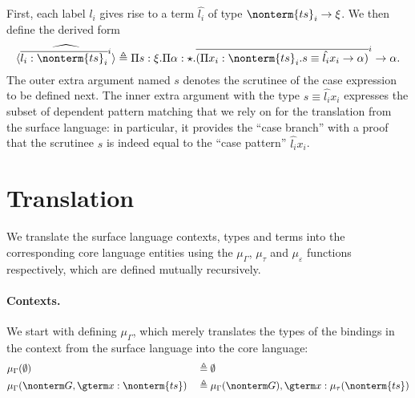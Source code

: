 \documentclass[a4paper]{article}
\begin{document}
\begin{itemize}
    First, each label $l_i$ gives rise to a term $\hat{l_i}$ of type $\nonterm{ts}_i \rightarrow \xi$.
    We then define the derived form
    \[
      \widehat{\langle \overline{l_i : \nonterm{ts}_i}^i \rangle}
        \triangleq
          \Pi s : \xi.
          \Pi \alpha : \star.
          \overline{(\Pi x_i : \nonterm{ts}_i. s \equiv \hat{l_i} x_i \rightarrow \alpha)}^i \rightarrow \alpha.
    \]
    The outer extra argument named $s$ denotes the scrutinee of the case expression to be defined next.
    The inner extra argument with the type $s \equiv \hat{l_i} x_i$
    expresses the subset of dependent pattern matching
    that we rely on for the translation from the surface language:
    in particular, it provides the ``case branch'' with a proof
    that the scrutinee $s$ is indeed equal to the ``case pattern'' $\hat{l_i} x_i$.
\end{itemize}

\section{Translation}

\newcommand{\tranctx}{\mu_\Gamma}
\newcommand{\tranty}{\mu_\tau}
\newcommand{\tranterm}{\mu_\varepsilon}

We translate the surface language contexts, types and terms into the corresponding core language entities
using the $\tranctx$, $\tranty$ and $\tranterm$ functions respectively,
which are defined mutually recursively.

\paragraph{Contexts.}
We start with defining $\tranctx$,
which merely translates the types of the bindings in the context from the surface language into the core language:
\begin{equation}
\begin{aligned}
  & \tranctx(\emptyset)                                       && \triangleq \emptyset                                               \\
  & \tranctx(\nonterm G, \gterm x : \nonterm{ts})             && \triangleq \tranctx(\nonterm G), \gterm x : \tranty(\nonterm{ts})  \\
\end{aligned}
\end{equation}
\end{document}
